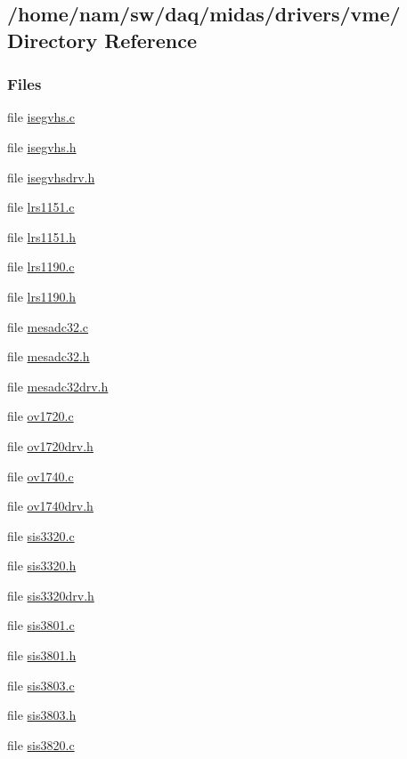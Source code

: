 \subsection{/home/nam/sw/daq/midas/drivers/vme/ Directory Reference}
\label{dir_a3208d6d4225da852e293df4c284fe6b}
\subsubsection*{Files}
\begin{DoxyCompactItemize}
\item 
file \hyperlink{isegvhs_8c}{isegvhs.c}
\item 
file \hyperlink{isegvhs_8h}{isegvhs.h}
\item 
file \hyperlink{isegvhsdrv_8h}{isegvhsdrv.h}
\item 
file \hyperlink{lrs1151_8c}{lrs1151.c}
\item 
file \hyperlink{lrs1151_8h}{lrs1151.h}
\item 
file \hyperlink{lrs1190_8c}{lrs1190.c}
\item 
file \hyperlink{lrs1190_8h}{lrs1190.h}
\item 
file \hyperlink{mesadc32_8c}{mesadc32.c}
\item 
file \hyperlink{mesadc32_8h}{mesadc32.h}
\item 
file \hyperlink{mesadc32drv_8h}{mesadc32drv.h}
\item 
file \hyperlink{ov1720_8c}{ov1720.c}
\item 
file \hyperlink{ov1720drv_8h}{ov1720drv.h}
\item 
file \hyperlink{ov1740_8c}{ov1740.c}
\item 
file \hyperlink{ov1740drv_8h}{ov1740drv.h}
\item 
file \hyperlink{sis3320_8c}{sis3320.c}
\item 
file \hyperlink{sis3320_8h}{sis3320.h}
\item 
file \hyperlink{sis3320drv_8h}{sis3320drv.h}
\item 
file \hyperlink{sis3801_8c}{sis3801.c}
\item 
file \hyperlink{sis3801_8h}{sis3801.h}
\item 
file \hyperlink{sis3803_8c}{sis3803.c}
\item 
file \hyperlink{sis3803_8h}{sis3803.h}
\item 
file \hyperlink{sis3820_8c}{sis3820.c}
\item 

\end{DoxyCompactItemize}
